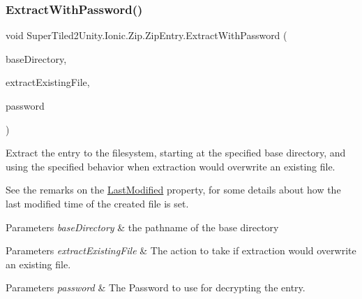 \subsubsection{\texorpdfstring{Extract\+With\+Password()}{ExtractWithPassword()}\hspace{0.1cm}{\footnotesize\ttfamily [4/5]}}
{\footnotesize\ttfamily void Super\+Tiled2\+Unity.\+Ionic.\+Zip.\+Zip\+Entry.\+Extract\+With\+Password (\begin{DoxyParamCaption}\item[{string}]{base\+Directory,  }\item[{\mbox{\hyperlink{namespace_super_tiled2_unity_1_1_ionic_1_1_zip_a3f8db7242d746d36b45114257b4fe4c0}{Extract\+Existing\+File\+Action}}}]{extract\+Existing\+File,  }\item[{string}]{password }\end{DoxyParamCaption})}



Extract the entry to the filesystem, starting at the specified base directory, and using the specified behavior when extraction would overwrite an existing file. 

See the remarks on the \mbox{\hyperlink{class_super_tiled2_unity_1_1_ionic_1_1_zip_1_1_zip_entry_acd1234fd27c216b59c166c2b96aba3dd}{Last\+Modified}} property, for some details about how the last modified time of the created file is set. 


\begin{DoxyParams}{Parameters}
{\em base\+Directory} & the pathname of the base directory\\
\hline
\end{DoxyParams}



\begin{DoxyParams}{Parameters}
{\em extract\+Existing\+File} & The action to take if extraction would overwrite an existing file.\\
\hline
\end{DoxyParams}



\begin{DoxyParams}{Parameters}
{\em password} & The Password to use for decrypting the entry.\\
\hline
\end{DoxyParams}
\mbox{\label{class_super_tiled2_unity_1_1_ionic_1_1_zip_1_1_zip_entry_a8ac45ec7b5cb019d573436c27e97b358}} 

